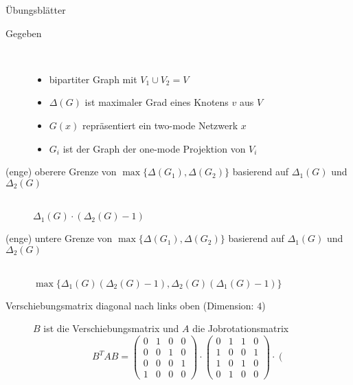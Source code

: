 \hspace*{-0.3cm}\begin{TOP}{Übungsblätter}
		\begin{description}
			\item[Gegeben] \ \\\vspace*{-\baselineskip}
				\begin{itemize}
					\item bipartiter Graph mit $V_1\cup V_2=V$
					\item $\Delta(G)$ ist maximaler Grad eines Knotens $v$ aus $V$
					\item $G(x)$ repräsentiert ein two-mode Netzwerk $x$
					\item $G_i$ ist der Graph der one-mode Projektion von $V_i$
				\end{itemize}
			\item[(enge) oberere Grenze von $\max\{\Delta(G_1),\Delta(G_2)\}$ basierend auf $\Delta_1(G)$ und $\Delta_2(G)$]\ \\\vspace*{-\baselineskip}
				$\Delta_1(G)\cdot (\Delta_2(G)-1)$\\\vspace*{-0.5\baselineskip}
			\item[(enge) untere Grenze von $\max\{\Delta(G_1),\Delta(G_2)\}$ basierend auf $\Delta_1(G)$ und $\Delta_2(G)$]\ \\\vspace*{-\baselineskip}
				$\max\{\Delta_1(G)(\Delta_2(G)-1), \Delta_2(G)(\Delta_1(G)-1)\}$\\
		\end{description}
		\begin{description}
			\item[Verschiebungsmatrix diagonal nach links oben (Dimension: $4$)] $B$ ist die Verschiebungsmatrix und $A$ die Jobrotationsmatrix
				\[B^TAB=\left(\begin{array}{cccc}
					0&1&0&0\\
					0&0&1&0\\
					0&0&0&1\\
					1&0&0&0
				\end{array}\right)\cdot\left(\begin{array}{cccc}
					0&1&1&0\\
					1&0&0&1\\
					1&0&1&0\\
					0&1&0&0
				\end{array}\right)\cdot \left(\begin{array}{cccc}

\end{array}\]
\end{description}
\end{TOP}
